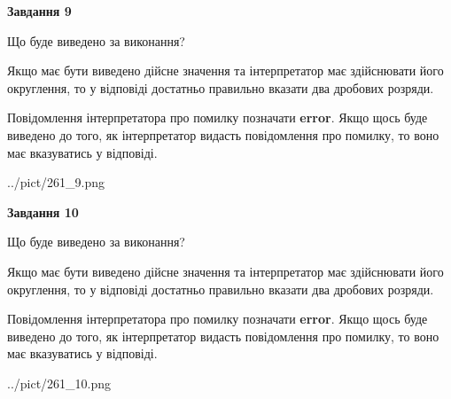 \documentclass[12pt, ukrainian]{article}
\begin{document}
{\begin {Large}
{\begin {center}\textbf{Завдання 9}\end {center}}\par
Що буде виведено за виконання? \par

Якщо має бути виведено дійсне значення та інтерпретатор має здійснювати його округлення, 
то у відповіді достатньо правильно вказати два дробових розряди.

Повідомлення інтерпретатора про помилку позначати \textbf{error}.
Якщо щось буде виведено до того, як інтерпретатор видасть повідомлення про помилку, 
то воно має вказуватись у відповіді. \par

\begin{center}
	{../pict/261_9.png}
\end{center}
\newpage

{\begin {center}\textbf{Завдання 10}\end {center}}\par
Що буде виведено за виконання? \par

Якщо має бути виведено дійсне значення та інтерпретатор має здійснювати його округлення, 
то у відповіді достатньо правильно вказати два дробових розряди.

Повідомлення інтерпретатора про помилку позначати \textbf{error}.
Якщо щось буде виведено до того, як інтерпретатор видасть повідомлення про помилку, 
то воно має вказуватись у відповіді. \par

\begin{center}
	{../pict/261_10.png}
\end{center}
\newpage

\end {Large}}
\end{document}
